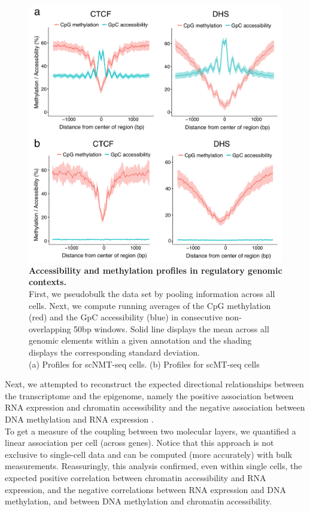 \begin{figure}[H]
	\centering
	\includegraphics[width=0.8\linewidth]{scnmt_pseudobulk_profiles}
	\caption[]{\textbf{Accessibility and methylation profiles in regulatory genomic contexts.}\\
	First, we pseudobulk the data set by pooling information across all cells. Next, we compute running averages of the CpG methylation (red) and the GpC accessibility (blue) in consecutive non-overlapping 50bp windows. Solid line displays the mean across all genomic elements within a given annotation and the shading displays the corresponding standard deviation.\\
	(a) Profiles for scNMT-seq cells. (b) Profiles for scMT-seq cells
	}
	\label{fig:scnmt_pseudobulked_profiles}
\end{figure}

Next, we attempted to reconstruct the expected directional relationships between the transcriptome and the epigenome, namely the positive association between RNA expression and chromatin accessibility and the negative association between DNA methylation and RNA expression \cite{Thurman2012,Angermueller2016}.\\
To get a measure of the coupling between two molecular layers, we quantified a linear association per cell (across genes). Notice that this approach is not exclusive to single-cell data and can be computed (more accurately) with bulk measurements. Reassuringly, this analysis confirmed, even within single cells, the expected positive correlation between chromatin accessibility and RNA expression, and the negative correlations between RNA expression and DNA methylation, and between DNA methylation and chromatin accessibility.


